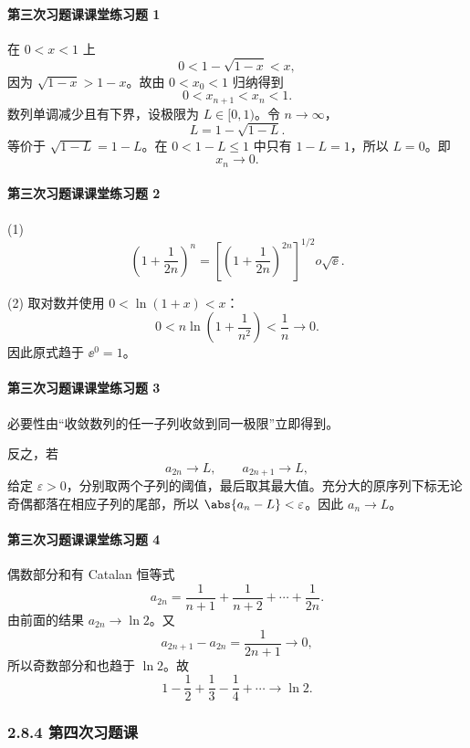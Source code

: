 \paragraph{第三次习题课课堂练习题 1}
\begin{xsolution}
在 $0<x<1$ 上
\[
  0<1-\sqrt{1-x}<x,
\]
因为 $\sqrt{1-x}>1-x$。故由 $0<x_0<1$ 归纳得到
\[
  0<x_{n+1}<x_n<1.
\]
数列单调减少且有下界，设极限为 $L\in[0,1)$。令 $n\to\infty$，
\[
  L=1-\sqrt{1-L}.
\]
等价于 $\sqrt{1-L}=1-L$。在 $0<1-L\le1$ 中只有 $1-L=1$，所以 $L=0$。即
\[
  \boxed{x_n\to0}.
\]
\end{xsolution}

\paragraph{第三次习题课课堂练习题 2}
\begin{xsolution}
(1)
\[
  \left(1+\frac1{2n}\right)^n
  =\left[\left(1+\frac1{2n}\right)^{2n}\right]^{1/2}	o\sqrt\ee.
\]

(2) 取对数并使用 $0<\ln(1+x)<x$：
\[
  0<n\ln\left(1+\frac1{n^2}\right)<\frac1n\to0.
\]
因此原式趋于 $\ee^0=1$。
\end{xsolution}

\paragraph{第三次习题课课堂练习题 3}
\begin{xsolution}
必要性由“收敛数列的任一子列收敛到同一极限”立即得到。

反之，若
\[
  a_{2n}\to L,
  \qquad
  a_{2n+1}\to L,
\]
给定 $\varepsilon>0$，分别取两个子列的阈值，最后取其最大值。充分大的原序列下标无论奇偶都落在相应子列的尾部，所以 $\abs{a_n-L}<\varepsilon$。因此 $a_n\to L$。
\end{xsolution}

\paragraph{第三次习题课课堂练习题 4}
\begin{xsolution}
偶数部分和有 Catalan 恒等式
\[
  a_{2n}=\frac1{n+1}+\frac1{n+2}+\cdots+\frac1{2n}.
\]
由前面的结果 $a_{2n}\to\ln2$。又
\[
  a_{2n+1}-a_{2n}=\frac1{2n+1}\to0,
\]
所以奇数部分和也趋于 $\ln2$。故
\[
  \boxed{1-\frac12+\frac13-\frac14+\cdots\to\ln2}.
\]
\end{xsolution}

\subsubsection*{2.8.4 第四次习题课}

